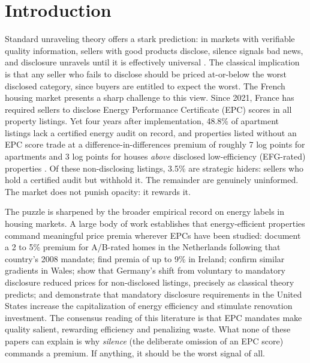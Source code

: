 \documentclass[10pt,letterpaper]{bp-template-concise}
\begin{document}
\section{Introduction}

Standard unraveling theory offers a stark prediction: in markets with verifiable quality information, sellers with good products disclose, silence signals bad news, and disclosure unravels until it is effectively universal \citep{grossman_informational_1981,milgrom_good_1981}. The classical implication is that any seller who fails to disclose should be priced at-or-below the worst disclosed category, since buyers are entitled to expect the worst. The French housing market presents a sharp challenge to this view. Since 2021, France has required sellers to disclose Energy Performance Certificate (EPC) scores in all property listings. Yet four years after implementation, 48.8\% of apartment listings lack a certified energy audit on record, and properties listed without an EPC score trade at a difference-in-differences premium of roughly 7 log points for apartments and 3 log points for houses \emph{above} disclosed low-efficiency (EFG-rated) properties \citep{patras_mandatory_2024}. Of these non-disclosing listings, 3.5\% are strategic hiders: sellers who hold a certified audit but withhold it. The remainder are genuinely uninformed. The market does not punish opacity: it rewards it.

The puzzle is sharpened by the broader empirical record on energy labels in housing markets. A large body of work establishes that energy-efficient properties command meaningful price premia wherever EPCs have been studied: \citet{brounen_kok_2011} document a 2 to 5\% premium for A/B-rated homes in the Netherlands following that country's 2008 mandate; \citet{hyland_lyons_2013} find premia of up to 9\% in Ireland; \citet{fuerst_energy_2016} confirm similar gradients in Wales; \citet{frondel_power_2018} show that Germany's shift from voluntary to mandatory disclosure reduced prices for non-disclosed listings, precisely as classical theory predicts; and \citet{myers_mandatory_2022} demonstrate that mandatory disclosure requirements in the United States increase the capitalization of energy efficiency and stimulate renovation investment. The consensus reading of this literature is that EPC mandates make quality salient, rewarding efficiency and penalizing waste. What none of these papers can explain is why \emph{silence} (the deliberate omission of an EPC score) commands a premium. If anything, it should be the worst signal of all.
\end{document}
